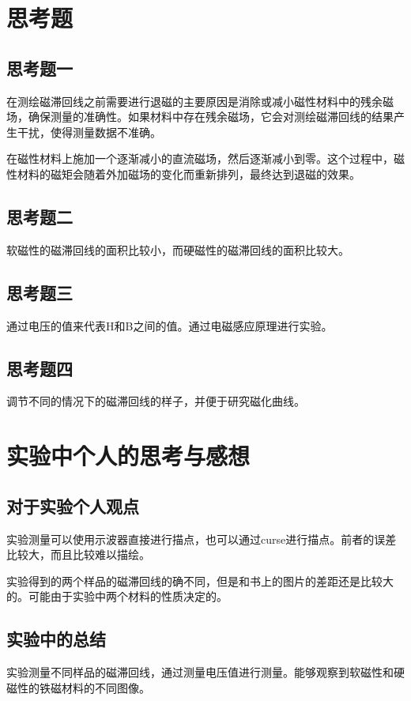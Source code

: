 \documentclass{ctexart}
\begin{document}
\section{思考题}
  \subsection{思考题一}
  在测绘磁滞回线之前需要进行退磁的主要原因是消除或减小磁性材料中的残余磁场，确保测量的准确性。如果材料中存在残余磁场，它会对测绘磁滞回线的结果产生干扰，使得测量数据不准确。

  在磁性材料上施加一个逐渐减小的直流磁场，然后逐渐减小到零。这个过程中，磁性材料的磁矩会随着外加磁场的变化而重新排列，最终达到退磁的效果。

  \subsection{思考题二}
  软磁性的磁滞回线的面积比较小，而硬磁性的磁滞回线的面积比较大。

  \subsection{思考题三}
  通过电压的值来代表H和B之间的值。通过电磁感应原理进行实验。

  \subsection{思考题四}
  调节不同的情况下的磁滞回线的样子，并便于研究磁化曲线。

\section{实验中个人的思考与感想}
  \subsection{对于实验个人观点}
  实验测量可以使用示波器直接进行描点，也可以通过curse进行描点。前者的误差比较大，而且比较难以描绘。

  实验得到的两个样品的磁滞回线的确不同，但是和书上的图片的差距还是比较大的。可能由于实验中两个材料的性质决定的。

  \subsection{实验中的总结}
  实验测量不同样品的磁滞回线，通过测量电压值进行测量。能够观察到软磁性和硬磁性的铁磁材料的不同图像。
\end{document}
